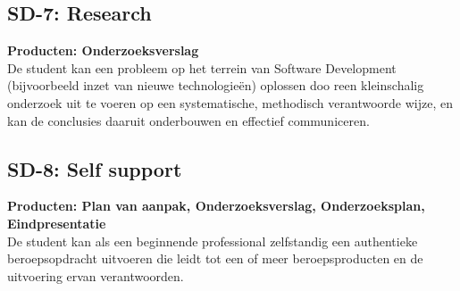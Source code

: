 \subsection{SD-7: Research}
\textbf{Producten: Onderzoeksverslag} \\
De student kan een probleem op het terrein van Software Development (bijvoorbeeld inzet van nieuwe technologieën) oplossen doo reen kleinschalig onderzoek uit te voeren op een systematische, methodisch verantwoorde wijze, en kan de conclusies daaruit onderbouwen en effectief communiceren.

\subsection{SD-8: Self support}
\textbf{Producten: Plan van aanpak, Onderzoeksverslag, Onderzoeksplan, Eindpresentatie} \\
De student kan als een beginnende professional zelfstandig een authentieke beroepsopdracht uitvoeren die leidt tot een of meer beroepsproducten en de uitvoering ervan verantwoorden.
